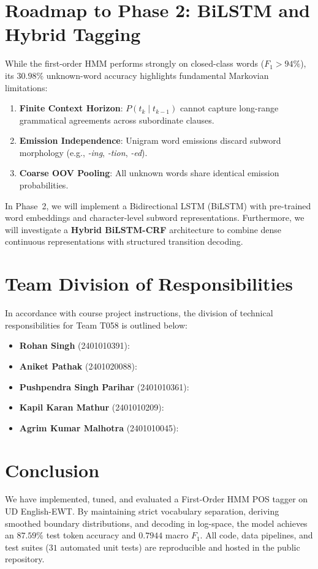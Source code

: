 \documentclass[conference]{IEEEtran}
\begin{document}
\section{Roadmap to Phase 2: BiLSTM and Hybrid Tagging}
While the first-order HMM performs strongly on closed-class words ($F_1 > 94\%$), its $30.98\%$ unknown-word accuracy highlights fundamental Markovian limitations:
\begin{enumerate}
    \item \textbf{Finite Context Horizon}: $P(t_k \mid t_{k-1})$ cannot capture long-range grammatical agreements across subordinate clauses.
    \item \textbf{Emission Independence}: Unigram word emissions discard subword morphology (e.g., \textit{-ing}, \textit{-tion}, \textit{-ed}).
    \item \textbf{Coarse OOV Pooling}: All unknown words share identical emission probabilities.
\end{enumerate}

In Phase~2, we will implement a Bidirectional LSTM (BiLSTM) with pre-trained word embeddings and character-level subword representations. Furthermore, we will investigate a \textbf{Hybrid BiLSTM-CRF} architecture to combine dense continuous representations with structured transition decoding.

\section{Team Division of Responsibilities}
In accordance with course project instructions, the division of technical responsibilities for Team T058 is outlined below:
\begin{itemize}
    \item \textbf{Rohan Singh} (2401010391):
    \item \textbf{Aniket Pathak} (2401020088):
    \item \textbf{Pushpendra Singh Parihar} (2401010361):
    \item \textbf{Kapil Karan Mathur} (2401010209):
    \item \textbf{Agrim Kumar Malhotra} (2401010045):
\end{itemize}

\section{Conclusion}
We have implemented, tuned, and evaluated a First-Order HMM POS tagger on UD English-EWT. By maintaining strict vocabulary separation, deriving smoothed boundary distributions, and decoding in log-space, the model achieves an $87.59\%$ test token accuracy and $0.7944$ macro $F_1$. All code, data pipelines, and test suites ($31$ automated unit tests) are reproducible and hosted in the public repository.
\end{document}
